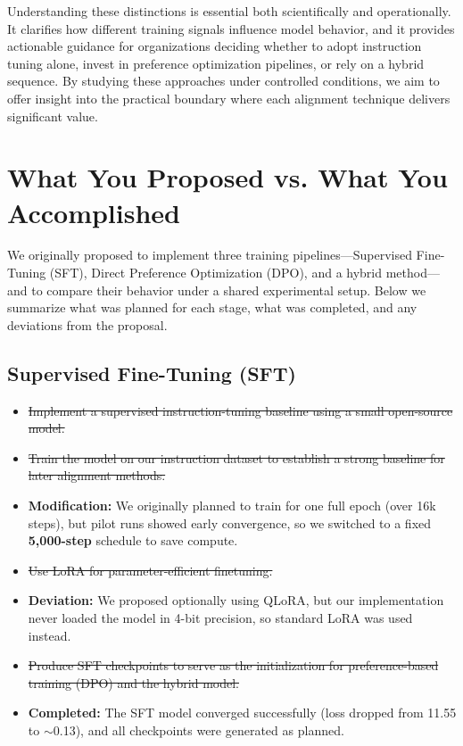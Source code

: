 \documentclass[11pt,a4paper]{article}
\begin{document}
Understanding these distinctions is essential both scientifically and operationally. It clarifies how different training signals influence model behavior, and it provides actionable guidance for organizations deciding whether to adopt instruction tuning alone, invest in preference optimization pipelines, or rely on a hybrid sequence. By studying these approaches under controlled conditions, we aim to offer insight into the practical boundary where each alignment technique delivers significant value.

\section{What You Proposed vs. What You Accomplished}

We originally proposed to implement three training pipelines—Supervised Fine-Tuning (SFT), Direct Preference Optimization (DPO), and a hybrid method—and to compare their behavior under a shared experimental setup. Below we summarize what was planned for each stage, what was completed, and any deviations from the proposal.

\subsection{Supervised Fine-Tuning (SFT)}

\begin{itemize}
    \item \sout{Implement a supervised instruction-tuning baseline using a small open-source model.}
    \item \sout{Train the model on our instruction dataset to establish a strong baseline for later alignment methods.}
    \item \textbf{Modification:} We originally planned to train for one full epoch (over 16k steps), but pilot runs showed early convergence, so we switched to a fixed \textbf{5{,}000-step} schedule to save compute.
    \item \sout{Use LoRA for parameter-efficient finetuning.}  
    \item \textbf{Deviation:} We proposed optionally using QLoRA, but our implementation never loaded the model in 4-bit precision, so standard LoRA was used instead.
    \item \sout{Produce SFT checkpoints to serve as the initialization for preference-based training (DPO) and the hybrid model.}
    \item \textbf{Completed:} The SFT model converged successfully (loss dropped from 11.55 to $\sim$0.13), and all checkpoints were generated as planned.
\end{itemize}
\end{document}
